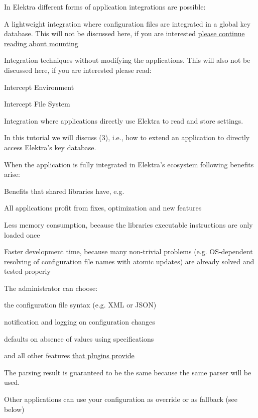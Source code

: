 In Elektra different forms of application integrations are possible\+:


\begin{DoxyEnumerate}
\item A lightweight integration where configuration files are integrated in a global key database. This will not be discussed here, if you are interested \hyperlink{doc_tutorials_mount_md}{please continue reading about mounting}
\item Integration techniques without modifying the applications. This will also not be discussed here, if you are interested please read\+:
\begin{DoxyItemize}
\item Intercept Environment
\item Intercept File System
\end{DoxyItemize}
\item Integration where applications directly use Elektra to read and store settings.
\end{DoxyEnumerate}

In this tutorial we will discuss (3), i.\+e., how to extend an application to directly access Elektra’s key database.

When the application is fully integrated in Elektra’s ecosystem following benefits arise\+:


\begin{DoxyItemize}
\item Benefits that shared libraries have, e.\+g.
\begin{DoxyItemize}
\item All applications profit from fixes, optimization and new features
\item Less memory consumption, because the libraries executable instructions are only loaded once
\item Faster development time, because many non-\/trivial problems (e.\+g. O\+S-\/dependent resolving of configuration file names with atomic updates) are already solved and tested properly
\end{DoxyItemize}
\item The administrator can choose\+:
\begin{DoxyItemize}
\item the configuration file syntax (e.\+g. X\+ML or J\+S\+ON)
\item notification and logging on configuration changes
\item defaults on absence of values using specifications
\item and all other features \hyperlink{src_plugins_README_md}{that plugins provide}
\end{DoxyItemize}
\item The parsing result is guaranteed to be the same because the same parser will be used.
\item Other applications can use your configuration as override or as fallback (see below)
\end{DoxyItemize}

